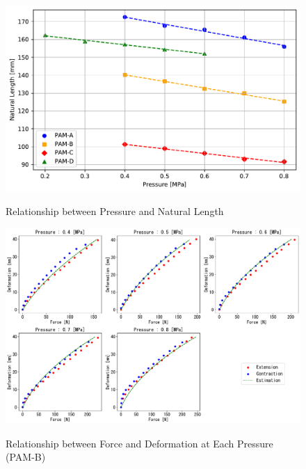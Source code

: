 \begin{figure}[t]
    \hfill
    \begin{minipage}{\columnwidth}
        \centering
        \includegraphics[width=\columnwidth]{fig/length_pressure.pdf} 
        \caption{Relationship between Pressure and Natural Length}
        \label{fig:length_pressure}
        \vspace{1em} 
        \includegraphics[width=\columnwidth]{fig/20231124_5_4s_2d_ieeesensors1.pdf}
        \caption{Relationship between Force and Deformation at Each Pressure (PAM-B)}
        \label{fig:pam_b_static1}
    \end{minipage}
    \hspace{0.05\textwidth} 
\end{figure}






